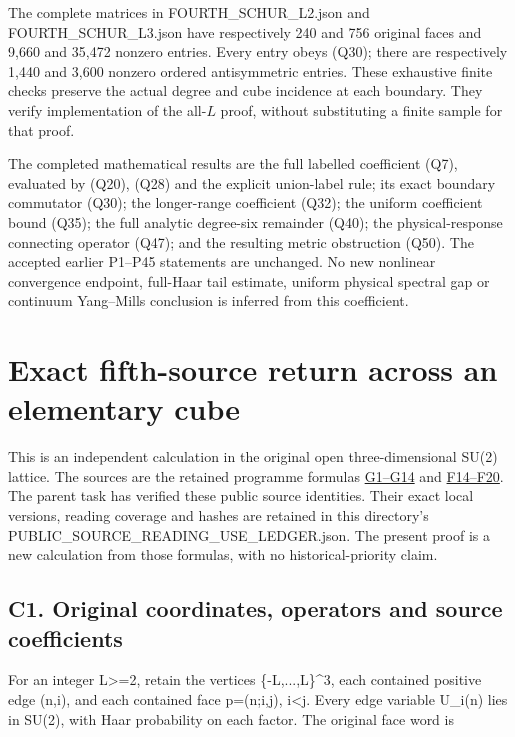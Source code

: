 \documentclass[11pt]{article}
\begin{document}
The complete matrices in FOURTH\_SCHUR\_L2.json and FOURTH\_SCHUR\_L3.json have respectively 240 and 756 original faces and 9,660 and 35,472 nonzero entries. Every entry obeys (Q30); there are respectively 1,440 and 3,600 nonzero ordered antisymmetric entries. These exhaustive finite checks preserve the actual degree and cube incidence at each boundary. They verify implementation of the all-\(L\) proof, without substituting a finite sample for that proof.

The completed mathematical results are the full labelled coefficient (Q7), evaluated by (Q20), (Q28) and the explicit union-label rule; its exact boundary commutator (Q30); the longer-range coefficient (Q32); the uniform coefficient bound (Q35); the full analytic degree-six remainder (Q40); the physical-response connecting operator (Q47); and the resulting metric obstruction (Q50). The accepted earlier P1–P45 statements are unchanged. No new nonlinear convergence endpoint, full-Haar tail estimate, uniform physical spectral gap or continuum Yang–Mills conclusion is inferred from this coefficient.
\clearpage
\section*{Exact fifth-source return across an elementary cube}

This is an independent calculation in the original open three-dimensional SU(2) lattice. The sources are the retained programme formulas \href{https://github.com/KokunoYumeto/yang-mills-interacting-workbench/blob/fa79faff2cd697e16cfa3a7953f36810c22c8922/yang-mills/continuations/20260915-gauge-native-band/RESEARCH_NOTE.md}{G1--G14} and \href{https://github.com/KokunoYumeto/yang-mills-interacting-workbench/blob/33a4c39de32c2c7fdf6f8ce796e40389f766669f/yang-mills/consolidation/20260921-fifth-reference/package/workbench/yang-mills/continuations/20260921-fifth-reference-return/FIFTH_REFERENCE.md#L139}{F14--F20}. The parent task has verified these public source identities. Their exact local versions, reading coverage and hashes are retained in this directory's PUBLIC\_SOURCE\_READING\_USE\_LEDGER.json. The present proof is a new calculation from those formulas, with no historical-priority claim.

\subsection*{C1. Original coordinates, operators and source coefficients}

For an integer L>=2, retain the vertices \{-L,...,L\}\textasciicircum{}3, each contained positive edge (n,i), and each contained face p=(n;i,j), i<j. Every edge variable U\_i(n) lies in SU(2), with Haar probability on each factor. The original face word is
\end{document}
